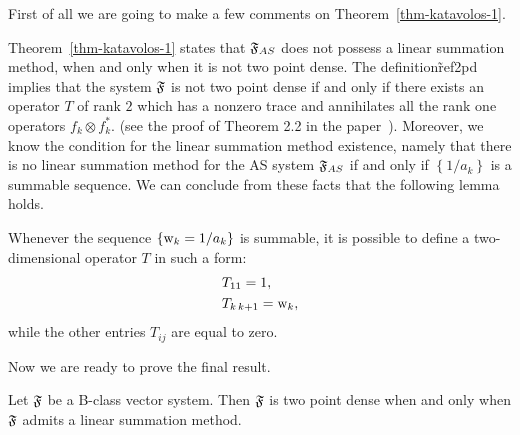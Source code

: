 \documentclass[12pt]{amsart}
\begin{document}
      First of all we are going to make a few comments on Theorem~\ref{thm-katavolos-1}.
      \begin{remark}
        Theorem~\ref{thm-katavolos-1} states that $\mathfrak{F}_{AS}$ does not possess a linear summation method,
          when and only when it is not two point dense.
        The definition\~ref{2pd} implies that the system $\mathfrak{F}$ is not two point dense
          if and only if there exists an operator $T$ of rank $2$
          which has a nonzero trace and annihilates all the rank one operators $f_k \otimes f^*_k$.
          (see the proof of Theorem 2.2 in the paper~\cite{katavolos}).
        Moreover, we know the condition for the linear summation method existence, namely that
          there is no linear summation method for the AS system $\mathfrak{F}_{AS}$ if and only if $\left\{1/a_k\right\}$
          is a summable sequence.
        We can conclude from these facts that the following lemma holds.
        \begin{lemma}
          \label{as-lemma}
          Whenever the sequence $\left\{\mathrm{w}_k = 1/a_k\right\}$ is summable,
            it is possible to define a two-dimensional operator $T$ in such a form:
          \begin{align*}
            &T_{11} = 1,\\
            &T_{k\, k+1} = \mathrm{w}_k,
          \end{align*}
          while the other entries $T_{ij}$ are equal to zero.
        \end{lemma}
      \end{remark}
      Now we are ready to prove the final result.
      \begin{theorem}
        \label{density-thm}
        Let $\mathfrak{F}$ be a B-class vector system.
        Then $\mathfrak{F}$ is two point dense when and only when $\mathfrak{F}$ admits a linear summation method.
      \end{theorem}
\end{document}

